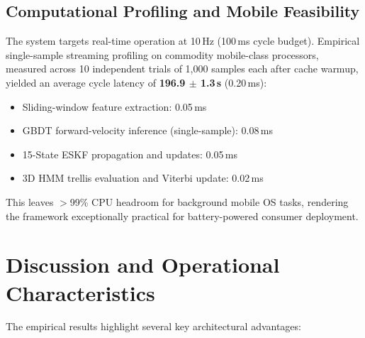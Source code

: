 \subsection{Computational Profiling and Mobile Feasibility}

The system targets real-time operation at 10\,Hz (100\,ms cycle budget). Empirical single-sample streaming profiling on commodity mobile-class processors, measured across 10 independent trials of 1,000 samples each after cache warmup, yielded an average cycle latency of \textbf{196.9 $\pm$ 1.3\,\textmu s} (0.20\,ms):
\begin{itemize}
\item Sliding-window feature extraction: 0.05\,ms
\item GBDT forward-velocity inference (single-sample): 0.08\,ms
\item 15-State ESKF propagation and updates: 0.05\,ms
\item 3D HMM trellis evaluation and Viterbi update: 0.02\,ms
\end{itemize}
This leaves $>$99\% CPU headroom for background mobile OS tasks, rendering the framework exceptionally practical for battery-powered consumer deployment.

\section{Discussion and Operational Characteristics}

The empirical results highlight several key architectural advantages:

